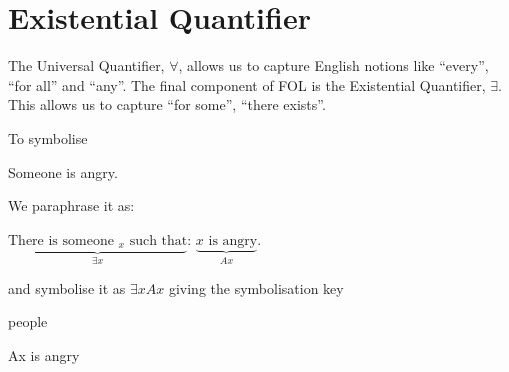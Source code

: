 %
%
%
%
%
%



\section{Existential Quantifier}
The Universal Quantifier, $\forall$, allows us to capture English notions like ``every'', ``for all'' and ``any''. The final component of FOL is the Existential Quantifier, $\exists$. This allows us to capture ``for some'', ``there exists''.

To symbolise
\begin{earg}
\item[\ex{q.e}] Someone is angry.
\end{earg}
We paraphrase it as:
\begin{ebullet}
\item $\underbrace{\text{There is someone $_x$ such that}}_{\exists x}$: $\underbrace{\text{$x$ is angry}}_{Ax}$.
\end{ebullet}
and symbolise it as $\exists x Ax$ giving the symbolisation key
\begin{ekey}
\item[\text{domain}] people
\item[Ax] is angry
\end{ekey}


